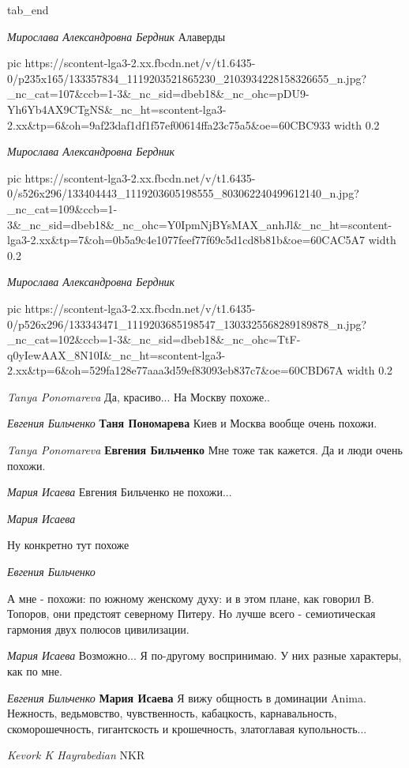   tab_end
\fi

\emph{Мирослава Александровна Бердник}
Алаверды

\ifcmt
  pic https://scontent-lga3-2.xx.fbcdn.net/v/t1.6435-0/p235x165/133357834_1119203521865230_2103934228158326655_n.jpg?_nc_cat=107&ccb=1-3&_nc_sid=dbeb18&_nc_ohc=pDU9-Yh6Yb4AX9CTgNS&_nc_ht=scontent-lga3-2.xx&tp=6&oh=9af23daf1df1f57ef00614ffa23c75a5&oe=60CBC933
	width 0.2
\fi

\emph{Мирослава Александровна Бердник}

\ifcmt
  pic https://scontent-lga3-2.xx.fbcdn.net/v/t1.6435-0/s526x296/133404443_1119203605198555_803062240499612140_n.jpg?_nc_cat=109&ccb=1-3&_nc_sid=dbeb18&_nc_ohc=Y0IpmNjBYsMAX_anhJl&_nc_ht=scontent-lga3-2.xx&tp=7&oh=0b5a9c4e1077feef77f69c5d1cd8b81b&oe=60CAC5A7
	width 0.2
\fi

\emph{Мирослава Александровна Бердник}

\ifcmt
  pic https://scontent-lga3-2.xx.fbcdn.net/v/t1.6435-0/p526x296/133343471_1119203685198547_1303325568289189878_n.jpg?_nc_cat=102&ccb=1-3&_nc_sid=dbeb18&_nc_ohc=TtF-q0yIewAAX_8N10I&_nc_ht=scontent-lga3-2.xx&tp=6&oh=529fa128e77aaa3d59ef83093eb837c7&oe=60CBD67A
	width 0.2
\fi

\emph{Tanya Ponomareva}
Да, красиво... На Москву похоже..

\emph{Евгения Бильченко}
\textbf{Таня Пономарева} Киев и Москва вообще очень похожи.

\emph{Tanya Ponomareva}
\textbf{Евгения Бильченко} Мне тоже так кажется. Да и люди очень похожи.

\emph{Мария Исаева}
Евгения Бильченко не похожи...

\emph{Мария Исаева}

Ну конкретно тут похоже

\emph{Евгения Бильченко}

А мне - похожи: по южному женскому духу: и в этом плане, как говорил В.
Топоров, они предстоят северному Питеру. Но лучше всего - семиотическая
гармония двух полюсов цивилизации.

\emph{Мария Исаева}
Возможно... Я по-другому воспринимаю. У них разные характеры, как по мне.

\emph{Евгения Бильченко}
\textbf{Мария Исаева} Я вижу общность в доминации Anima. Нежность, ведьмовство,
чувственность, кабацкость, карнавальность, скоморошечность, гигантскость и
крошечность, златоглавая купольность...

\emph{Kevork K Hayrabedian}
NKR

